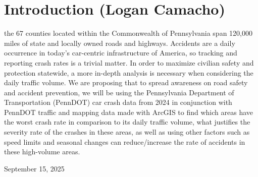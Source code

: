 \documentclass[journal]{IEEEtran}
\begin{document}
\section{Introduction (Logan Camacho)}
% 
% 
% 
% 
 the 67 counties located within the Commonwealth of Pennsylvania span 120,000 miles of state and locally owned roads and highways. \cite{PennDOT2024CrashFacts} Accidents are a daily occurrence in today's car-centric infrastructure of America, so tracking and reporting crash rates is a trivial matter. In order to maximize civilian safety and protection statewide, a more in-depth analysis is necessary when considering the daily traffic volume. We are proposing that to spread awareness on road safety and accident prevention, we will be using the Pennsylvania Department of Transportation (PennDOT) car crash data from 2024 in conjunction with PennDOT traffic and mapping data made with ArcGIS to find which areas have the worst crash rate in comparison to its daily traffic volume, what justifies the severity rate of the crashes in these areas, as well as using other factors such as speed limits and seasonal changes can reduce/increase the rate of accidents in these high-volume areas.


\hfill 
 
\hfill September 15, 2025



%
%
\end{document}
